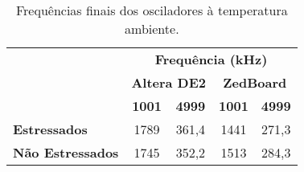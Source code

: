 \begin{table}[H]
\centering
\caption{Frequências finais dos osciladores à temperatura ambiente.}
\begin{tabular}{l|cccc|}
\cline{2-5}
 & \multicolumn{4}{c|}{\textbf{Frequência (kHz)}} \\ \cline{2-5} 
 & \multicolumn{2}{c|}{\textbf{Altera DE2}} & \multicolumn{2}{c|}{\textbf{ZedBoard}} \\ \cline{2-5} 
 & \multicolumn{1}{c|}{\textbf{1001}} & \multicolumn{1}{c|}{\textbf{4999}} & \multicolumn{1}{c|}{\textbf{1001}} & \textbf{4999} \\ \hline
\multicolumn{1}{|l|}{\textbf{Estressados}} & \multicolumn{1}{c|}{1789} & \multicolumn{1}{c|}{361,4} & \multicolumn{1}{c|}{1441} & 271,3 \\ \hline
\multicolumn{1}{|l|}{\textbf{Não Estressados}} & \multicolumn{1}{c|}{1745} & \multicolumn{1}{c|}{352,2} & \multicolumn{1}{c|}{1513} & 284,3 \\ \hline
\end{tabular}
\label{tab:FreqFinaisTAmb}
\end{table}
